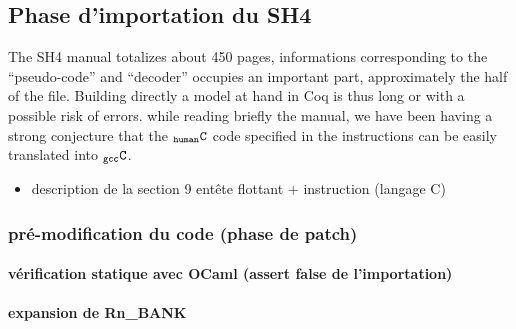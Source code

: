 \documentclass[a4paper, 11pt]{article}
\newcommand{\gccC}{$_{\tt gcc}{\tt C}$\xspace}
\newcommand{\hC}{$_{\tt human}{\tt C}$\xspace}
\begin{document}
  \subsection{Phase d'importation du SH4}
The SH4 manual totalizes about 450 pages, informations corresponding to the ``pseudo-code'' and ``decoder'' occupies an important part, approximately the half of the file. Building directly a model at hand in Coq is thus long or with a possible risk of errors. 
while reading briefly the manual, we have been having a strong conjecture that the \hC code specified in the instructions can be easily translated into \gccC.
    \begin{itemize}
    \item description de la section 9
 entête flottant + instruction (langage C)
    \end{itemize}


    \subsubsection{pré-modification du code (phase de patch)}
      \paragraph{vérification statique avec OCaml (assert false de l'importation)}
      \paragraph{expansion de Rn\_BANK}
\end{document}
